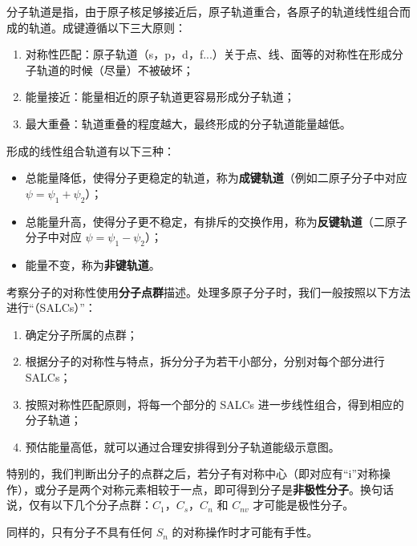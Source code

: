 
分子轨道是指，由于原子核足够接近后，原子轨道重合，各原子的轨道线性组合而成的轨道。成键遵循以下三大原则：
\begin{enumerate}
\item 对称性匹配：原子轨道（s，p，d，f...）关于点、线、面等的对称性在形成分子轨道的时候（尽量）不被破坏；
\item 能量接近：能量相近的原子轨道更容易形成分子轨道；
\item 最大重叠：轨道重叠的程度越大，最终形成的分子轨道能量越低。
\end{enumerate}

形成的线性组合轨道有以下三种：
\begin{itemize}
\item 总能量降低，使得分子更稳定的轨道，称为\textbf{成键轨道}（例如二原子分子中对应 $\psi = \psi_1 + \psi_2$）；
\item 总能量升高，使得分子更不稳定，有排斥的交换作用，称为\textbf{反键轨道}（二原子分子中对应 $\psi = \psi_1 - \psi_2$）；
\item 能量不变，称为\textbf{非键轨道}。
\end{itemize}

考察分子的对称性使用\textbf{分子点群}描述。处理多原子分子时，我们一般按照以下方法进行“（SALCs）”：
\begin{enumerate}
\item 确定分子所属的点群；
\item 根据分子的对称性与特点，拆分分子为若干小部分，分别对每个部分进行 SALCs；
\item 按照对称性匹配原则，将每一个部分的 SALCs 进一步线性组合，得到相应的分子轨道；
\item 预估能量高低，就可以通过合理安排得到分子轨道能级示意图。
\end{enumerate}

特别的，我们判断出分子的点群之后，若分子有对称中心（即对应有“i”对称操作），或分子是两个对称元素相较于一点，即可得到分子是\textbf{非极性分子}。换句话说，仅有以下几个分子点群：$C_1$，$C_s$，$C_n$ 和 $C_{nv}$ 才可能是极性分子。

同样的，只有分子不具有任何 $S_n$ 的对称操作时才可能有手性。


